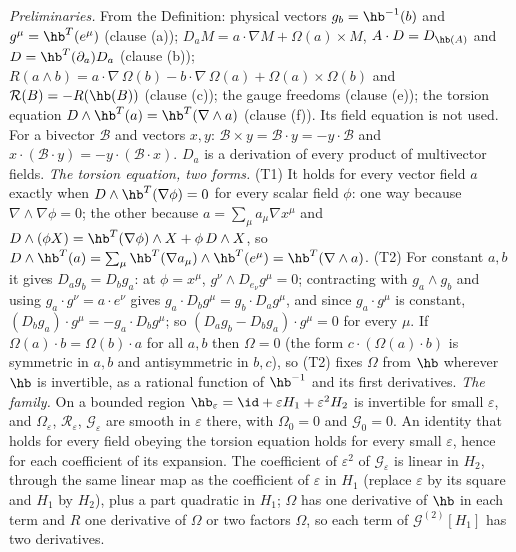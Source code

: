 \emph{Preliminaries.} From the Definition: physical vectors $g_{b} = \hb^{-1}(b)$ and $g^{\mu} = \hb^{T}(e^{\mu})$ (clause (a)); $D_{a}M = a \cdot \nabla M + \Omega(a) \times M$, $A \cdot D = D_{\hb(A)}$ and $D = \hb^{T}(\partial_{a})D_{a}$ (clause (b)); $R(a \wedge b) = a \cdot \nabla\,\Omega(b) - b \cdot \nabla\,\Omega(a) + \Omega(a) \times \Omega(b)$ and $\mathcal{R}(B) = -R(\hb(B))$ (clause (c)); the gauge freedoms (clause (e)); the torsion equation $D \wedge \hb^{T}(a) = \hb^{T}(\nabla \wedge a)$ (clause (f)). Its field equation is not used. For a bivector $\mathcal{B}$ and vectors $x, y$: $\mathcal{B} \times y = \mathcal{B} \cdot y = -y \cdot \mathcal{B}$ and $x \cdot (\mathcal{B} \cdot y) = -y \cdot (\mathcal{B} \cdot x)$. $D_{a}$ is a derivation of every product of multivector fields. \emph{The torsion equation, two forms.} (T1) It holds for every vector field $a$ exactly when $D \wedge \hb^{T}(\nabla\phi) = 0$ for every scalar field $\phi$: one way because $\nabla \wedge \nabla\phi = 0$; the other because $a = \sum_{\mu}a_{\mu}\nabla x^{\mu}$ and $D \wedge (\phi X) = \hb^{T}(\nabla\phi) \wedge X + \phi\,D \wedge X$, so $D \wedge \hb^{T}(a) = \sum_{\mu}\hb^{T}(\nabla a_{\mu}) \wedge \hb^{T}(e^{\mu}) = \hb^{T}(\nabla \wedge a)$. (T2) For constant $a, b$ it gives $D_{a}g_{b} = D_{b}g_{a}$: at $\phi = x^{\mu}$, $g^{\nu} \wedge D_{e_{\nu}}g^{\mu} = 0$; contracting with $g_{a} \wedge g_{b}$ and using $g_{a} \cdot g^{\nu} = a \cdot e^{\nu}$ gives $g_{a} \cdot D_{b}g^{\mu} = g_{b} \cdot D_{a}g^{\mu}$, and since $g_{a} \cdot g^{\mu}$ is constant, $(D_{b}g_{a}) \cdot g^{\mu} = -g_{a} \cdot D_{b}g^{\mu}$; so $(D_{a}g_{b} - D_{b}g_{a}) \cdot g^{\mu} = 0$ for every $\mu$. If $\Omega(a) \cdot b = \Omega(b) \cdot a$ for all $a, b$ then $\Omega = 0$ (the form $c \cdot (\Omega(a) \cdot b)$ is symmetric in $a, b$ and antisymmetric in $b, c$), so (T2) fixes $\Omega$ from $\hb$ wherever $\hb$ is invertible, as a rational function of $\hb^{-1}$ and its first derivatives. \emph{The family.} On a bounded region $\hb_{\varepsilon} = \id + \varepsilon H_{1} + \varepsilon^{2}H_{2}$ is invertible for small $\varepsilon$, and $\Omega_{\varepsilon}$, $\mathcal{R}_{\varepsilon}$, $\mathcal{G}_{\varepsilon}$ are smooth in $\varepsilon$ there, with $\Omega_{0} = 0$ and $\mathcal{G}_{0} = 0$. An identity that holds for every field obeying the torsion equation holds for every small $\varepsilon$, hence for each coefficient of its expansion. The coefficient of $\varepsilon^{2}$ of $\mathcal{G}_{\varepsilon}$ is linear in $H_{2}$, through the same linear map as the coefficient of $\varepsilon$ in $H_{1}$ (replace $\varepsilon$ by its square and $H_{1}$ by $H_{2}$), plus a part quadratic in $H_{1}$; $\Omega$ has one derivative of $\hb$ in each term and $R$ one derivative of $\Omega$ or two factors $\Omega$, so each term of $\mathcal{G}^{(2)}[H_{1}]$ has two derivatives.

